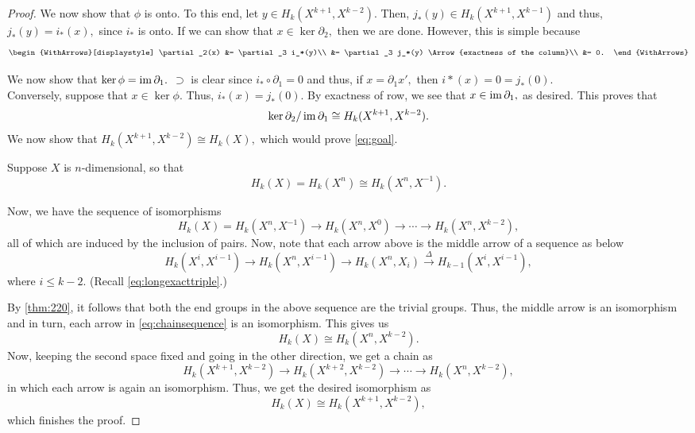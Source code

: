 \documentclass[12pt]{article}
\begin{document}
\begin{proof}
	We now show that $\phi$ is onto. To this end, let $y \in H_k(X^{k+1}, X^{k-2}).$ Then, $j_*(y) \in H_k(X^{k+1}, X^{k-1})$ and thus, $j_*(y) = i_*(x),$ since $i_*$ is onto. If we can show that $x \in \ker \partial_2,$ then we are done. However, this is simple because
	\[\begin{WithArrows}[displaystyle]
		\partial_2(x) &= \partial_3 i_*(y)\\
		&= \partial_3 j_*(y) \Arrow{exactness of the column}\\
		&= 0.
	\end{WithArrows}\]

	We now show that $\ker \phi = \operatorname{im} \partial_1.$ $\supset$ is clear since $i_* \circ \partial_1 = 0$ and thus, if $x = \partial_1 x',$ then $i*(x) = 0 = j_*(0).$\\
	Conversely, suppose that $x \in \ker \phi.$ Thus, $i_*(x) = j_*(0).$ By exactness of row, we see that $x \in \operatorname{im} \partial_1,$ as desired. This proves that
	\begin{equation*} 
		\ker\partial_2/\operatorname{im}\partial_1 \cong H_k(X^{k+1}, X^{k-2}).
	\end{equation*}
	We now show that $H_k(X^{k+1}, X^{k-2}) \cong H_k(X),$ which would prove \cref{eq:goal}.

	Suppose $X$ is $n$-dimensional, so that
	\begin{equation*} 
		H_k(X) = H_k(X^n) \cong H_k(X^n, X^{-1}).
	\end{equation*}

	Now, we have the sequence of isomorphisms
	\begin{equation} \tag{$*$} \label{eq:chainsequence}
		H_k(X) = H_k(X^n, X^{-1}) \to H_k(X^n, X^0) \to \cdots \to H_k(X^n, X^{k-2}),
	\end{equation}
	all of which are induced by the inclusion of pairs. Now, note that each arrow above is the middle arrow of a sequence as below
	\begin{equation*} 
		H_k(X^i, X^{i-1}) \to H_k(X^n, X^{i-1}) \to H_k(X^n, X_i) \overset{\Delta}{\longrightarrow} H_{k-1}(X^i, X^{i-1}),
	\end{equation*}
	where $i \le k - 2.$ (Recall \cref{eq:longexacttriple}.)

	By \cref{thm:220}, it follows that both the end groups in the above sequence are the trivial groups. Thus, the middle arrow is an isomorphism and in turn, each arrow in \cref{eq:chainsequence} is an isomorphism. This gives us
	\begin{equation*} 
		H_k(X) \cong H_k(X^n, X^{k-2}).
	\end{equation*}
	Now, keeping the second space fixed and going in the other direction, we get a chain as
	\begin{equation*} 
		H_k(X^{k+1}, X^{k-2}) \to H_k(X^{k+2}, X^{k-2}) \to \cdots \to H_k(X^n, X^{k-2}),
	\end{equation*}
	in which each arrow is again an isomorphism. Thus, we get the desired isomorphism as
	\begin{equation*} 
		H_k(X) \cong H_k(X^{k+1}, X^{k-2}),
	\end{equation*}
	which finishes the proof.
\end{proof}

\newpage
\nocite{*}
\printbibliography[heading=bibintoc]
\end{document}
